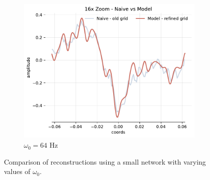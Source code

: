 \begin{figure}[h]
\begin{subfigure}[b]{0.32\textwidth}
        \centering
        \includegraphics[width=\textwidth]{img/ch3/16x_zoom-1hl-16hf-64hz.pdf}
        \caption{$\omega_0=64$ Hz}
    \end{subfigure}
    \caption{Comparison of reconstructions using a small network with varying values of $\omega_0$.}
    \label{f:capacity-filter-16hf-increasing-omega}
\end{figure}

 





